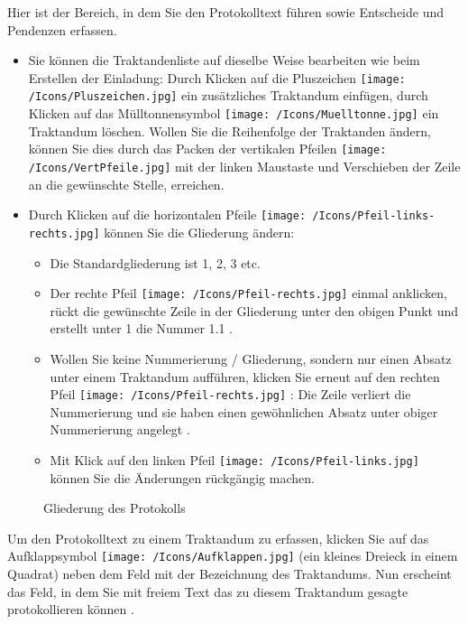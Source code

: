 Hier ist der Bereich, in dem Sie den Protokolltext führen sowie Entscheide und Pendenzen erfassen.

\begin{itemize}
\item
Sie können die Traktandenliste auf dieselbe Weise bearbeiten wie beim Erstellen der Einladung: Durch Klicken auf die Pluszeichen \texttt{[image: /Icons/Pluszeichen.jpg]}  ein zusätzliches Traktandum einfügen, durch Klicken auf das Mülltonnensymbol \texttt{[image: /Icons/Muelltonne.jpg]}  ein Traktandum löschen. Wollen Sie die Reihenfolge der Traktanden ändern, können Sie dies durch das Packen der vertikalen Pfeilen \texttt{[image: /Icons/VertPfeile.jpg]}  mit der linken Maustaste und Verschieben der Zeile an die gewünschte Stelle, erreichen.
\item
Durch Klicken auf die horizontalen Pfeile \texttt{[image: /Icons/Pfeil-links-rechts.jpg]}  können Sie die Gliederung ändern:

	\begin{itemize}
		\item
		Die Standardgliederung ist 1, 2, 3 etc. 
		\item
		Der rechte Pfeil \texttt{[image: /Icons/Pfeil-rechts.jpg]}  einmal anklicken, rückt die gewünschte Zeile in der Gliederung unter den obigen Punkt und erstellt unter 1 die Nummer 1.1 .
		\item
		Wollen Sie keine Nummerierung / Gliederung, sondern nur einen Absatz unter einem Traktandum aufführen, klicken Sie erneut auf den rechten Pfeil \texttt{[image: /Icons/Pfeil-rechts.jpg]} : Die Zeile verliert die Nummerierung und sie haben einen gewöhnlichen Absatz unter obiger Nummerierung angelegt .
		\item
		Mit Klick auf den linken Pfeil \texttt{[image: /Icons/Pfeil-links.jpg]}  können Sie die Änderungen rückgängig machen.
	\end{itemize}
\end{itemize}

\begin{figure}[H]
\caption{Gliederung des Protokolls}
\end{figure}

Um den Protokolltext zu einem Traktandum zu erfassen, klicken Sie auf das Aufklappsymbol \texttt{[image: /Icons/Aufklappen.jpg]}  (ein kleines Dreieck in einem Quadrat) neben dem Feld mit der Bezeichnung des Traktandums. Nun erscheint das Feld, in dem Sie mit freiem Text das zu diesem Traktandum gesagte protokollieren können .

